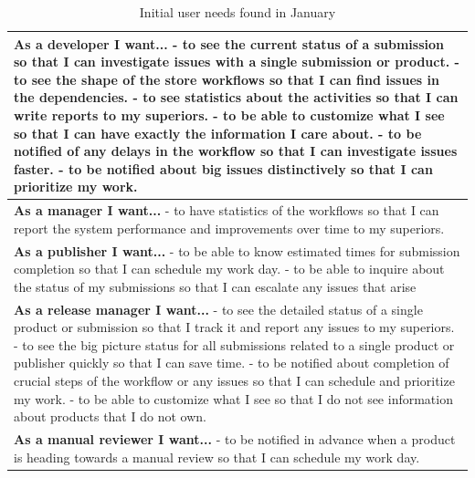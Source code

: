 \begin{table}[htb]
\begin{center}
\begin{tabularx}{\linewidth}{| X |}
\hline

\textbf{As a developer I want...} \newline
- to see the current status of a submission so that I can investigate issues with a single submission or product.\newline
- to see the shape of the store workflows so that I can find issues in the dependencies.\newline
- to see statistics about the activities so that I can write reports to my superiors.\newline
- to be able to customize what I see so that I can have exactly the information I care about.\newline
- to be notified of any delays in the workflow so that I can investigate issues faster.\newline
- to be notified about big issues distinctively so that I can prioritize my work.
\\
\hline

\textbf{As a manager I want...} \newline
- to have statistics of the workflows so that I can report the system performance and improvements over time to my superiors.
\\
\hline

\textbf{As a publisher I want...} \newline
- to be able to know estimated times for submission completion so that I can schedule my work day.\newline
- to be able to inquire about the status of my submissions so that I can escalate any issues that arise
\\
\hline

\textbf{As a release manager I want...} \newline
- to see the detailed status of a single product or submission so that I track it and report any issues to my superiors. \newline
- to see the big picture status for all submissions related to a single product or publisher quickly so that I can save time. \newline
- to be notified about completion of crucial steps of the workflow or any issues so that I can schedule and prioritize my work. \newline
- to be able to customize what I see so that I do not see information about products that I do not own.
\\
\hline

\textbf{As a manual reviewer I want...} \newline
- to be notified in advance when a product is heading towards a manual review so that I can schedule my work day.
\\
\hline

\end{tabularx}
\end{center}
\caption{Initial user needs found in January}
\label{tab:userneeds}
\end{table}

